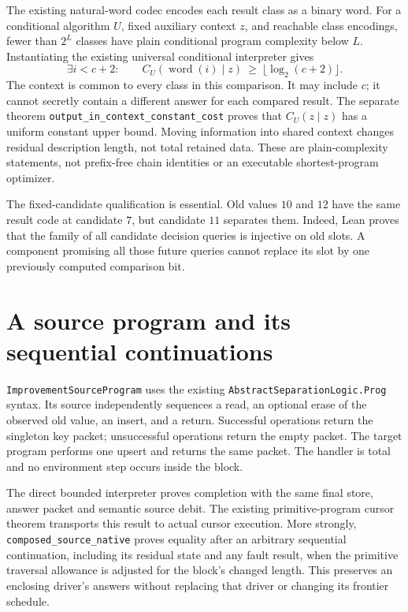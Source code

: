 \documentclass[11pt,a4paper]{article}
\newcommand{\code}[1]{\nolinkurl{#1}}
\begin{document}
The existing natural-word codec encodes each result class as a binary word.
For a conditional algorithm $U$, fixed auxiliary context $z$, and reachable
class encodings, fewer than $2^L$ classes have plain conditional program
complexity below $L$. Instantiating the existing universal conditional
interpreter gives
\[
 \exists i<c+2:\qquad
 C_U(\operatorname{word}(i)\mid z)\ \ge\ \lfloor\log_2(c+2)\rfloor.
\]
The context is common to every class in this comparison. It may include $c$;
it cannot secretly contain a different answer for each compared result.
The separate theorem \code{output_in_context_constant_cost} proves that
$C_U(z\mid z)$ has a uniform constant upper bound. Moving information into
shared context changes residual description length, not total retained data.
These are plain-complexity statements, not prefix-free chain identities or
an executable shortest-program optimizer.

The fixed-candidate qualification is essential. Old values $10$ and $12$
have the same result code at candidate $7$, but candidate $11$ separates them.
Indeed, Lean proves that the family of all candidate decision queries is
injective on old slots. A component promising all those future queries cannot
replace its slot by one previously computed comparison bit.

\section{A source program and its sequential continuations}

\code{ImprovementSourceProgram} uses the existing
\code{AbstractSeparationLogic.Prog} syntax. Its source independently sequences
a read, an optional erase of the observed old value, an insert, and a return.
Successful operations return the singleton key packet; unsuccessful operations
return the empty packet. The target program performs one upsert and returns
the same packet. The handler is total and no environment step occurs inside
the block.

The direct bounded interpreter proves completion with the same final store,
answer packet and semantic source debit. The existing primitive-program cursor
theorem transports this result to actual cursor execution. More strongly,
\code{composed_source_native} proves equality after an arbitrary sequential
continuation, including its residual state and any fault result, when the
primitive traversal allowance is adjusted for the block's changed length.
This preserves an enclosing driver's answers without replacing that driver
or changing its frontier schedule.
\end{document}
